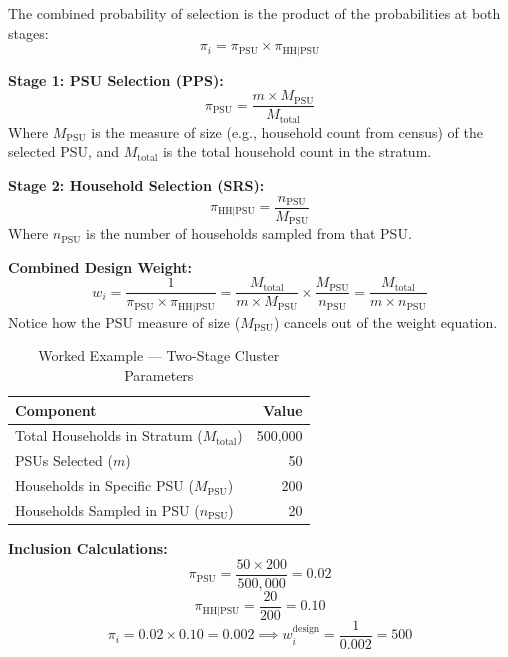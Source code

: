 \documentclass[11pt,a4paper]{article}
\begin{document}
The combined probability of selection is the product of the probabilities at both stages:
\begin{equation}
  \pi_i = \pi_{\text{PSU}} \times \pi_{\text{HH}\mid\text{PSU}}
\end{equation}

\textbf{Stage 1: PSU Selection (PPS):}
\begin{equation}
  \pi_{\text{PSU}} = \frac{m \times M_{\text{PSU}}}{M_{\text{total}}}
\end{equation}
Where $M_{\text{PSU}}$ is the measure of size (e.g., household count from census) of the selected PSU, and $M_{\text{total}}$ is the total household count in the stratum.

\textbf{Stage 2: Household Selection (SRS):}
\begin{equation}
  \pi_{\text{HH}\mid\text{PSU}} = \frac{n_{\text{PSU}}}{M_{\text{PSU}}}
\end{equation}
Where $n_{\text{PSU}}$ is the number of households sampled from that PSU.

\textbf{Combined Design Weight:}
\begin{equation}
  w_i = \frac{1}{\pi_{\text{PSU}} \times \pi_{\text{HH}\mid\text{PSU}}} = \frac{M_{\text{total}}}{m \times M_{\text{PSU}}} \times \frac{M_{\text{PSU}}}{n_{\text{PSU}}} = \frac{M_{\text{total}}}{m \times n_{\text{PSU}}}
\end{equation}
Notice how the PSU measure of size ($M_{\text{PSU}}$) cancels out of the weight equation.

\begin{table}[htbp]
  \centering
  \caption{Worked Example --- Two-Stage Cluster Parameters}
  \label{tab:cluster_example}
  \begin{tabular}{lr}
    \toprule
    \textbf{Component} & \textbf{Value} \\
    \midrule
    Total Households in Stratum ($M_{\text{total}}$) & 500,000 \\
    PSUs Selected ($m$) & 50 \\
    Households in Specific PSU ($M_{\text{PSU}}$) & 200 \\
    Households Sampled in PSU ($n_{\text{PSU}}$) & 20 \\
    \bottomrule
  \end{tabular}
\end{table}

\textbf{Inclusion Calculations:}
\[
  \pi_{\text{PSU}} = \frac{50 \times 200}{500,000} = 0.02
\]
\[
  \pi_{\text{HH}\mid\text{PSU}} = \frac{20}{200} = 0.10
\]
\[
  \pi_i = 0.02 \times 0.10 = 0.002 \implies w_i^{\text{design}} = \frac{1}{0.002} = 500
\]
\end{document}
